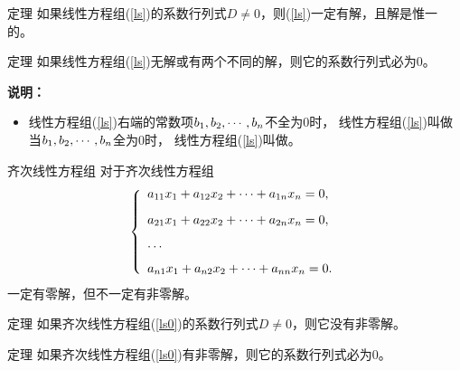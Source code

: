\begin{frame}
  \begin{footnotesize}
    \begin{block}{定理}
      如果线性方程组(\ref{ls})的系数行列式$D\ne 0$，则(\ref{ls})一定有解，且解是惟一的。
    \end{block}

    \begin{block}{定理}
      如果线性方程组(\ref{ls})无解或有两个不同的解，则它的系数行列式必为0。
    \end{block}

    \vspace{0.3cm}
    \textbf{说明：} \\
    \begin{itemize}
    \item 
      线性方程组(\ref{ls})右端的常数项$b_1,b_2,\cdots, b_n$不全为0时，
      线性方程组(\ref{ls})叫做\\[0.2cm]
      当$b_1,b_2,\cdots, b_n$全为0时，
      线性方程组(\ref{ls})叫做。
    \end{itemize}

  \end{footnotesize}
\end{frame}


\begin{frame}
  \begin{footnotesize}
    \begin{block}{齐次线性方程组}
      对于齐次线性方程组
      \begin{equation}\label{ls0}
        \left\{
        \begin{array}{l}
          a_{11}x_1 + a_{12}x_2 + \cdots + a_{1n}x_n = 0, \\[0.3cm]
          a_{21}x_1 + a_{22}x_2 + \cdots + a_{2n}x_n = 0, \\[0.3cm]
          \cdots \\[0.2cm]
          a_{n1}x_1 + a_{n2}x_2 + \cdots + a_{nn}x_n = 0.
        \end{array}
        \right.
      \end{equation}
      一定有零解，但不一定有非零解。
    \end{block}
  \end{footnotesize}
\end{frame}

\begin{frame}
  \begin{footnotesize}
    \begin{block}{定理}
      如果齐次线性方程组(\ref{ls0})的系数行列式$D\ne 0$，则它没有非零解。
    \end{block}

    \vspace{1.0cm}
    
    \begin{block}{定理}
      如果齐次线性方程组(\ref{ls0})有非零解，则它的系数行列式必为0。
    \end{block}
    
  \end{footnotesize}
\end{frame}


